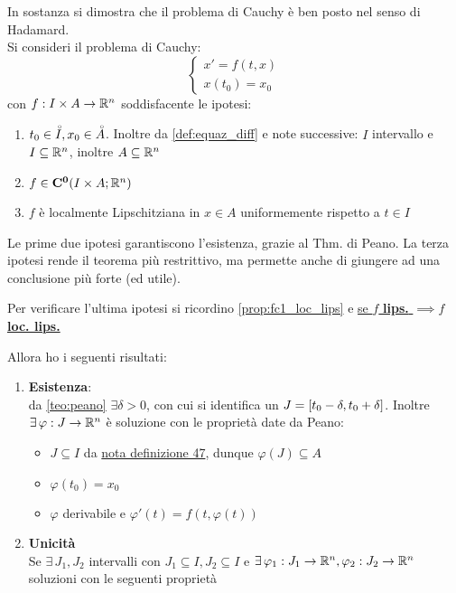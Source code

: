 \begin{theorem}
	\label{teo:cau_locale_part_1}
	In sostanza si dimostra che il problema di Cauchy è ben posto nel senso di Hadamard.\\
	Si consideri il problema di Cauchy:
	$$\begin{cases}x'=f(t,x)\\x(t_0)=x_0\end{cases}$$
	con $f:I\times A \to \mathbb{R}^n$ soddisfacente le ipotesi:
	\begin{enumerate}
		\item $t_0\in \accentset{\circ}{I}, x_0\in \accentset{\circ}{A}$. Inoltre da \ref{def:equaz_diff} e note successive: $I$ intervallo e $I\subseteq \mathbb{R}^n$, inoltre $A\subseteq \mathbb{R}^n$
		\item $f\in \mathbf{C^{0}}(I\times A; \mathbb{R}^n)$ 
		\item $f$ è localmente Lipschitziana in $x\in A$ uniformemente rispetto a $t\in I$
	\end{enumerate}
	\begin{note}
		Le prime due ipotesi garantiscono l'esistenza, grazie al Thm. di Peano. La terza ipotesi rende il teorema più restrittivo, ma permette anche di giungere ad una conclusione più forte (ed utile).
	\end{note}
	\begin{note}
		Per verificare l'ultima ipotesi si ricordino \ref{prop:fc1_loc_lips} e \hyperlink{note:if_lips_then_loclips}{se $f$ \textbf{lips.} $\implies f$ \textbf{loc. lips.}}
	\end{note}
	Allora ho i seguenti risultati:
	\begin{enumerate}
		\item \textbf{Esistenza}:\\
		da \ref{teo:peano} $\exists \delta>0$, con cui si identifica un $J=\left[t_0-\delta,t_0+\delta\right]$. Inoltre $\exists\,\varphi : J \to \mathbb{R}^n$ è soluzione con le proprietà date da Peano:
		\begin{itemize}
			\item $J\subseteq I$ da \hyperlink{note:diff_eq_sol_definit_set}{nota definizione 47}, dunque $\varphi(J)\subseteq A$
			\item $\varphi(t_0)=x_0$
			\item $\varphi$ derivabile e $\varphi'(t)=f(t,\varphi(t))$
		\end{itemize}
		\item \textbf{Unicità}\\
		Se $\exists\,J_1,J_2$ intervalli con $J_1\subseteq I,J_2\subseteq I$ e $\exists\,\varphi_1:J_1\to \mathbb{R}^n, \varphi_2:J_2\to \mathbb{R}^n$ soluzioni con le seguenti proprietà

\end{enumerate}
\end{theorem}
